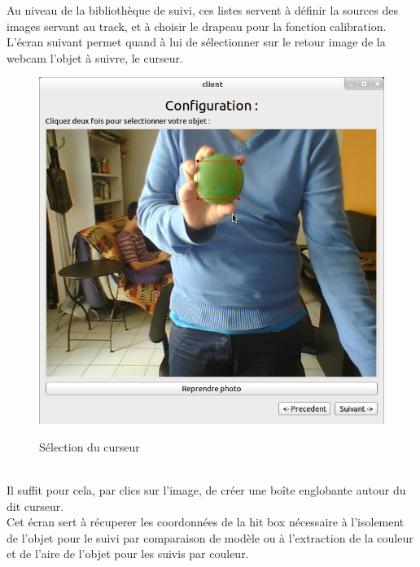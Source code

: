 \documentclass{report}
\begin{document}
				Au niveau de la bibliothèque de suivi, ces listes servent à définir la sources des images servant au track, et à choisir le drapeau pour la fonction calibration.
				\newpage
				L'écran suivant permet quand à lui de sélectionner sur le retour image de la webcam l'objet à suivre, le curseur.\\
				\begin{figure}[!h]
						\centering
						\includegraphics[scale=0.4]{../images/Capture1.png}\\
						\caption{Sélection du curseur}
						\label{Sélection du curseur}
				\end{figure}\\
				Il suffit pour cela, par clics sur l'image, de créer une boîte englobante autour du dit curseur.\\
				Cet écran sert à récuperer les coordonnées de la hit box nécessaire à l'isolement de l'objet pour le suivi par comparaison de modèle ou à l'extraction de la couleur et de l'aire de l'objet pour les suivis par couleur.
				\newpage
\end{document}
